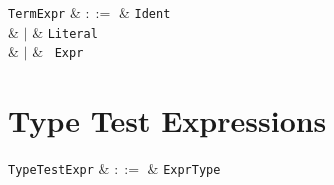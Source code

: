 \begin{syntax}
  \verb+TermExpr+ & $::=$ & \verb+Ident+\\
  & $|$ & \verb+Literal+\\
  & $|$ & \token{(}\ \verb+Expr+\ \token{)}\\
\end{syntax}


\section{Type Test Expressions}
\label{c_expr_type_tests}

\begin{syntax}
  \verb+TypeTestExpr+ & $::=$ & \verb+Expr+\;\;\verb+Type+\\
\end{syntax}

